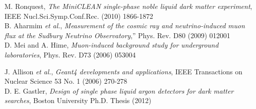 \documentclass{JINST}
\begin{document}
\begin{thebibliography}{999}

	M. Ronquest, \emph{The MiniCLEAN single-phase noble liquid dark matter experiment}, IEEE Nucl.Sci.Symp.Conf.Rec. (2010) 1866-1872 \\

	B. Aharmim {\it et al.}, \emph{Measurement of the cosmic ray and neutrino-induced muon flux at the Sudbury Neutrino Observatory},'' Phys. Rev. D80 (2009) 012001 \\

	D. Mei and A. Hime, \emph{Muon-induced background study for underground laboratories}, Phys. Rev. D73 (2006) 053004

	J. Allison {\it et al.}, \emph{Geant4 developments and applications}, IEEE Transactions on Nuclear Science 53 No. 1 (2006) 270-278 \\

	D. E. Gastler, \emph{Design of single phase liquid argon detectors for dark matter searches}, Boston University Ph.D. Thesis (2012) \\

\end{thebibliography}
\end{document}
